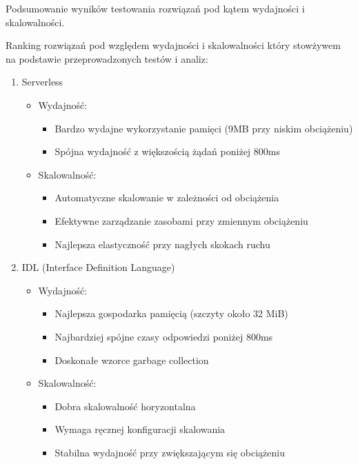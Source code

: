 \documentclass[runningheads,12pt]{llncs}
\begin{document}
\newpage


Podsumowanie wyników testowania rozwiązań pod kątem wydajności i skalowalności.

Ranking rozwiązań pod względem wydajności i skalowalności który stowżywem na podstawie przeprowadzonych testów i analiz:

\begin{enumerate}
    \item Serverless
    \begin{itemize}
        \item Wydajność:
        \begin{itemize}
            \item Bardzo wydajne wykorzystanie pamięci (9MB przy niskim obciążeniu)
            \item Spójna wydajność z większością żądań poniżej 800ms
        \end{itemize}
        \item Skalowalność:
        \begin{itemize}
            \item Automatyczne skalowanie w zależności od obciążenia
            \item Efektywne zarządzanie zasobami przy zmiennym obciążeniu
            \item Najlepsza elastyczność przy nagłych skokach ruchu
        \end{itemize}
    \end{itemize}

    \item IDL (Interface Definition Language)
    \begin{itemize}
        \item Wydajność:
        \begin{itemize}
            \item Najlepsza gospodarka pamięcią (szczyty około 32 MiB)
            \item Najbardziej spójne czasy odpowiedzi poniżej 800ms
            \item Doskonałe wzorce garbage collection
        \end{itemize}
        \item Skalowalność:
        \begin{itemize}
            \item Dobra skalowalność horyzontalna
            \item Wymaga ręcznej konfiguracji skalowania
            \item Stabilna wydajność przy zwiększającym się obciążeniu
        \end{itemize}
    \end{itemize}


\end{enumerate}
\end{document}
